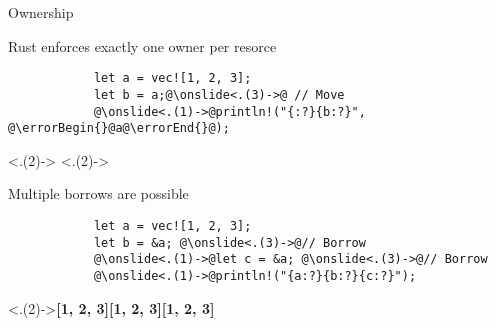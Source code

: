 \begin{multiframe}[fragile]{Ownership}
	\begin{subframe}
		Rust enforces \alert{exactly one} owner per resorce\\[1em]%
		\pause%

		\begin{verbatim}
            let a = vec![1, 2, 3];
            let b = a;@\onslide<.(3)->@ // Move
            @\onslide<.(1)->@println!("{:?}{b:?}", @\errorBegin{}@a@\errorEnd{}@);
        \end{verbatim}
		\markError<.(2)->{}%
		\onslide<.(2)->\\[1em]%
		\addtocounter{beamerpauses}{2}%
	\end{subframe}

	\begin{subframe}
		Multiple \alert{borrows} are possible\\[1em]%
		\pause%

		\begin{verbatim}
            let a = vec![1, 2, 3];
            let b = &a; @\onslide<.(3)->@// Borrow
            @\onslide<.(1)->@let c = &a; @\onslide<.(3)->@// Borrow
            @\onslide<.(1)->@println!("{a:?}{b:?}{c:?}");
        \end{verbatim}
		\onslide<.(2)->{\footnotesize\ttfamily\bfseries[1, 2, 3][1, 2, 3][1, 2, 3]}\\%
		\addtocounter{beamerpauses}{2}%
	\end{subframe}
\end{multiframe}
